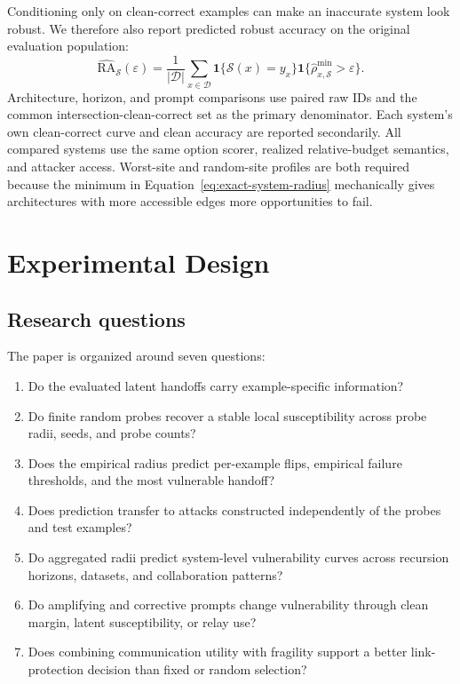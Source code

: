 \documentclass[11pt]{article}
\newcommand{\eps}{\varepsilon}
\newcommand{\sys}{\mathcal S}
\begin{document}
Conditioning only on clean-correct examples can make an inaccurate system look
robust. We therefore also report predicted robust accuracy on the original
evaluation population:
\begin{equation}
    \widehat{\mathrm{RA}}_{\sys}(\eps)
    =\frac{1}{|\mathcal D|}\sum_{x\in\mathcal D}
    \mathbf 1\{\sys(x)=y_x\}
    \mathbf 1\{\widehat\rho^{\min}_{x,\sys}>\eps\}.
    \label{eq:predicted-robust-accuracy}
\end{equation}
Architecture, horizon, and prompt comparisons use paired raw IDs and the common
intersection-clean-correct set as the primary denominator. Each system's own
clean-correct curve and clean accuracy are reported secondarily. All compared
systems use the same option scorer, realized relative-budget semantics, and
attacker access. Worst-site and random-site profiles are both required because
the minimum in Equation~\eqref{eq:exact-system-radius} mechanically gives
architectures with more accessible edges more opportunities to fail.

\section{Experimental Design}
\label{sec:experimental-design}

\subsection{Research questions}

The paper is organized around seven questions:
\begin{enumerate}
    \item[\textbf{RQ0}] Do the evaluated latent handoffs carry
    example-specific information?
    \item[\textbf{RQ1}] Do finite random probes recover a stable local
    susceptibility across probe radii, seeds, and probe counts?
    \item[\textbf{RQ2}] Does the empirical radius predict per-example flips,
    empirical failure thresholds, and the most vulnerable handoff?
    \item[\textbf{RQ3}] Does prediction transfer to attacks constructed
    independently of the probes and test examples?
    \item[\textbf{RQ4}] Do aggregated radii predict system-level vulnerability
    curves across recursion horizons, datasets, and collaboration patterns?
    \item[\textbf{RQ5}] Do amplifying and corrective prompts change
    vulnerability through clean margin, latent susceptibility, or relay use?
    \item[\textbf{RQ6}] Does combining communication utility with fragility
    support a better link-protection decision than fixed or random selection?
\end{enumerate}
\end{document}
